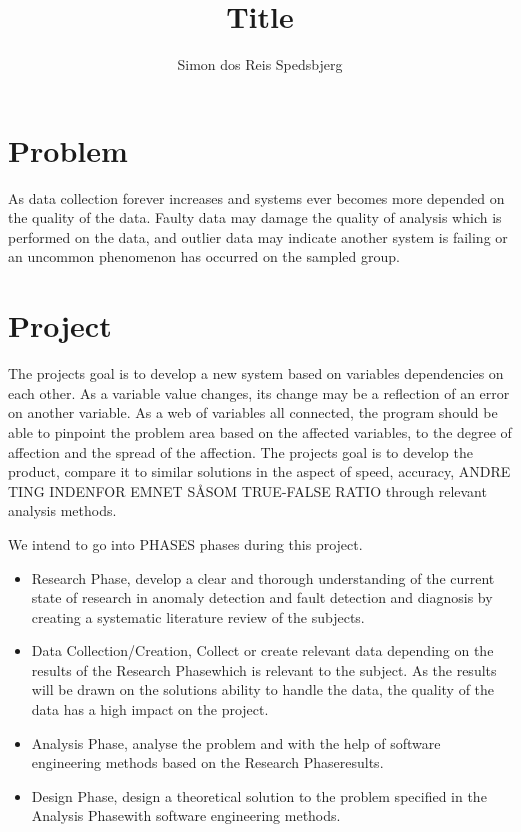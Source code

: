 \documentclass[a4paper,8pt]{article}
\title{Title}
\author{Simon dos Reis Spedsbjerg}
\newcommand{\Phases}{PHASES }
\newcommand{\phaseq}{Research Phase}
\newcommand{\phasew}{Data Collection/Creation}
\newcommand{\phasee}{Analysis Phase}
\newcommand{\phaser}{Design Phase}
\begin{document}
	\maketitle
	
	\section{Problem}
	As data collection forever increases and systems ever becomes more depended on the quality of the data. Faulty data may damage the quality of analysis which is performed on the data, and outlier data may indicate another system is failing or an uncommon phenomenon has occurred on the sampled group.
	
	\section{Project}
	The projects goal is to develop a new system based on variables dependencies on each other. As a variable value changes, its change may be a reflection of an error on another variable. As a web of variables all connected, the program should be able to pinpoint the problem area based on the affected variables, to the degree of affection and the spread of the affection. The projects goal is to develop the product, compare it to similar solutions in the aspect of speed, accuracy, ANDRE TING INDENFOR EMNET SÅSOM TRUE-FALSE RATIO through relevant analysis methods. 
	
	
	We intend to go into \Phases phases during this project.
		\begin{itemize}
			\item \phaseq, develop a clear and thorough understanding of the current state of research in anomaly detection and fault detection and diagnosis by creating a systematic literature review of the subjects.
			\item \phasew, Collect or create relevant data depending on the results of the \phaseq which is relevant to the subject. As the results will be drawn on the solutions ability to handle the data, the quality of the data has a high impact on the project.
			\item \phasee, analyse the problem and with the help of software engineering methods based on the \phaseq \space results.
			\item \phaser, design a theoretical solution to the problem specified in the \phasee with software engineering methods.
		\end{itemize}
	
\end{document}
